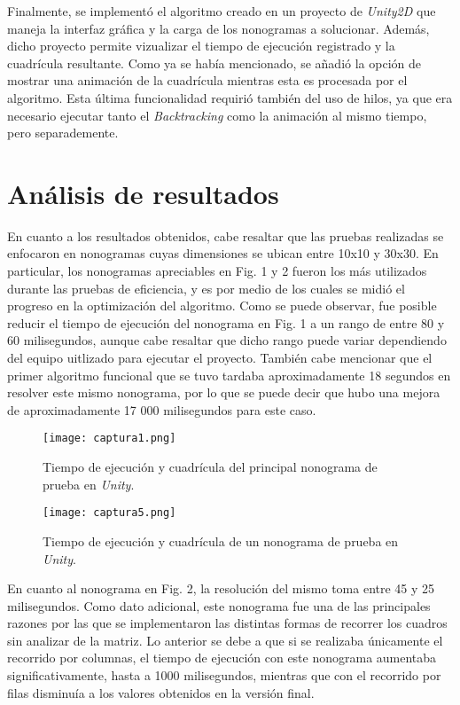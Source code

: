 \documentclass[conference]{IEEEtran}
\begin{document}
Finalmente, se implementó el algoritmo creado en un proyecto de \textit{Unity2D} que maneja la interfaz gráfica y la carga de los nonogramas a solucionar. Además, dicho proyecto permite vizualizar el tiempo de ejecución registrado y la cuadrícula resultante. Como ya se había mencionado, se añadió la opción de mostrar una animación de la cuadrícula mientras esta es procesada por el algoritmo. Esta última funcionalidad requirió también del uso de hilos, ya que era necesario ejecutar tanto el \textit{Backtracking} como la animación al mismo tiempo, pero separademente.

\section{Análisis de resultados}
En cuanto a los resultados obtenidos, cabe resaltar que las pruebas realizadas se enfocaron en nonogramas cuyas dimensiones se ubican entre 10x10 y 30x30. En particular, los nonogramas apreciables en Fig. 1 y 2 fueron los más utilizados durante las pruebas de eficiencia, y es por medio de los cuales se midió el progreso en la optimización del algoritmo. Como se puede observar, fue posible reducir el tiempo de ejecución del nonograma en Fig. 1 a un rango de entre 80 y 60 milisegundos, aunque cabe resaltar que dicho rango puede variar dependiendo del equipo uitlizado para ejecutar el proyecto. También cabe mencionar que el primer algoritmo funcional que se tuvo tardaba aproximadamente 18 segundos en resolver este mismo nonograma, por lo que se puede decir que hubo una mejora de aproximadamente 17 000 milisegundos para este caso.

\begin{figure}[htbp]
\centerline{\texttt{[image: captura1.png]}}
\caption{Tiempo de ejecución y cuadrícula del principal nonograma de prueba en \textit{Unity}.}
\label{PerraLoca}
\end{figure}
\begin{figure}[htbp]
\centerline{\texttt{[image: captura5.png]}}
\caption{Tiempo de ejecución y cuadrícula de un nonograma de prueba en \textit{Unity}.}
\label{ArbolNavidad}
\end{figure}

En cuanto al nonograma en Fig. 2, la resolución del mismo toma entre 45 y 25 milisegundos. Como dato adicional, este nonograma fue una de las principales razones por las que se implementaron las distintas formas de recorrer los cuadros sin analizar de la matriz. Lo anterior se debe a que si se realizaba únicamente el recorrido por columnas, el tiempo de ejecución con este nonograma aumentaba significativamente, hasta a 1000 milisegundos, mientras que con el recorrido por filas disminuía a los valores obtenidos en la versión final. 
\end{document}

